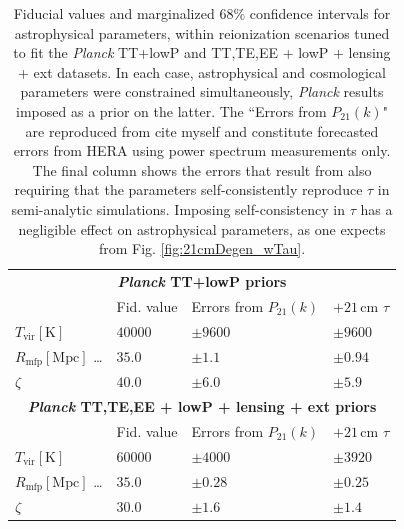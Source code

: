 \documentclass[twocolumn,aps,prd,nofootinbib,showpacs]{revtex4-1}
\begin{document}
\begin{table}
\caption{\label{tab:AstroParams} Fiducial values and marginalized $68\%$ confidence intervals for astrophysical parameters, within reionization scenarios tuned to fit the \emph{Planck} TT+lowP and TT,TE,EE + lowP + lensing + ext datasets. In each case, astrophysical and cosmological parameters were constrained simultaneously, \emph{Planck} results imposed as a prior on the latter. The ``Errors from $P_{21}(k)$" are reproduced from \acl{cite myself} and constitute forecasted errors from HERA using power spectrum measurements only. The final column shows the errors that result from also requiring that the parameters self-consistently reproduce $\tau$ in semi-analytic simulations. Imposing self-consistency in $\tau$ has a negligible effect on astrophysical parameters, as one expects from Fig. \ref{fig:21cmDegen_wTau}.}
\begin{ruledtabular}
\begin{tabular}{llll}
\multicolumn{4}{c}{   \textbf{\emph{Planck} TT+lowP priors} }  \\
& Fid. value & Errors from  $P_{21} (k)$ & $+21\,\textrm{cm}$ $\tau$\\
\hline
$T_\textrm{vir}\left[ \textrm{K} \right]$  \dotfill & $40000$ & $\pm 9600$ & $\pm 9600$ \\
 $R_\textrm{mfp}\left[ \textrm{Mpc} \right]$ \dots \dotfill & $35.0$ & $\pm1.1$ & $\pm0.94$ \\
$\zeta$ \dotfill& $40.0$ & $\pm 6.0$ & $\pm 5.9$ \\
\hline 
\multicolumn{4}{c}{    \textbf{\emph{Planck} TT,TE,EE + lowP + lensing + ext priors} }  \\
& Fid. value & Errors from  $P_{21} (k)$  & $+21\,\textrm{cm}$ $\tau$\\
\hline
$T_\textrm{vir}\left[ \textrm{K} \right]$  \dotfill & $60000$ & $\pm 4000$ & $\pm 3920$ \\
$R_\textrm{mfp}\left[ \textrm{Mpc} \right]$ \dots \dotfill & $35.0$ & $\pm 0.28$ & $\pm 0.25$ \\
$\zeta$ \dotfill& $30.0$ & $\pm 1.6$ & $\pm 1.4$\\
\end{tabular}
\end{ruledtabular}
\end{table}
\end{document}
